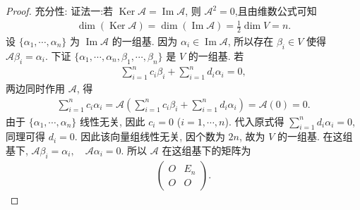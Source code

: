 \documentclass[../../main.tex]{subfiles}%
\begin{document}
\begin{proof}
{\heiti 充分性:} 
{\color{blue}证法一:}若 \(\operatorname{Ker}\mathscr{A}=\operatorname{Im}\mathscr{A}\), 则 \(\mathscr{A}^2=0\),且由维数公式可知
\begin{align*}
\dim(\operatorname{Ker} \mathscr{A}) =\dim(\operatorname{Im} \mathscr{A})= \frac{1}{2} \dim V = n.
\end{align*}
设 \(\{\alpha_1,\cdots,\alpha_n\}\) 为 \(\operatorname{Im}\mathscr{A}\) 的一组基. 因为 \(\alpha_i \in \operatorname{Im}\mathscr{A}\), 所以存在 \(\beta_i \in V\) 使得 \(\mathscr{A}\beta_i=\alpha_i\). 下证 \(\{\alpha_1,\cdots,\alpha_n,\beta_1,\cdots,\beta_n\}\) 是 \(V\) 的一组基. 若
\begin{align*}
\sum_{i=1}^n c_i\beta_i + \sum_{i=1}^n d_i\alpha_i = 0,
\end{align*}
两边同时作用 \(\mathscr{A}\), 得
\begin{align*}
\sum_{i=1}^n c_i\alpha_i = \mathscr{A}\left(\sum_{i=1}^n c_i\beta_i + \sum_{i=1}^n d_i\alpha_i\right) = \mathscr{A}(0)=0.
\end{align*}
由于 \(\{\alpha_1,\cdots,\alpha_n\}\) 线性无关, 因此 \(c_i=0\) (\(i=1,\cdots,n\)). 代入原式得 \(\sum_{i=1}^n d_i\alpha_i = 0\), 同理可得 \(d_i=0\). 因此该向量组线性无关, 因个数为 \(2n\), 故为 \(V\) 的一组基.
在这组基下, \(\mathscr{A}\beta_i=\alpha_i, \quad \mathscr{A}\alpha_i=0\). 所以 \(\mathscr{A}\) 在这组基下的矩阵为
\begin{align*}
\begin{pmatrix}
O & E_n \\
O & O
\end{pmatrix}.
\end{align*}


\end{proof}
\end{document}
